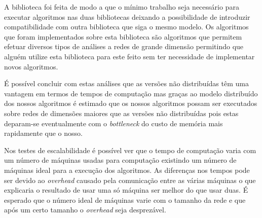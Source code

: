 A biblioteca foi feita de modo a que o mínimo trabalho seja necessário para executar algoritmos nas duas bibliotecas deixando a possibilidade de introduzir compatibilidade com outra biblioteca que siga o mesmo modelo. Os algoritmos que foram implementados sobre esta biblioteca são algoritmos que permitem efetuar diversos tipos de análises a redes de grande dimensão permitindo que alguém utilize esta biblioteca para este feito sem ter necessidade de implementar novos algoritmos.

É possível concluir com estas análises que as versões não distribuídas têm uma vantagem em termos de tempos de computação mas graças ao modelo distribuído dos nossos algoritmos é estimado que os nossos algoritmos possam ser executados sobre redes de dimensões maiores que as versões não distribuídas pois estas deparam-se eventualmente com o \textit{bottleneck} do custo de memória mais rapidamente que o nosso.

Nos testes de escalabilidade é possível ver que o tempo de computação varia com um número de máquinas usadas para computação existindo um número de máquinas ideal para a execução dos algoritmos. As diferenças nos tempos pode ser devido ao \textit{overhead} causado pela comunicação entre as várias máquinas o que explicaria o resultado de usar uma só máquina ser melhor do que usar duas. É esperado que o número ideal de máquinas varie com o tamanho da rede e que após um certo tamanho o \textsl{overhead} seja desprezável.

